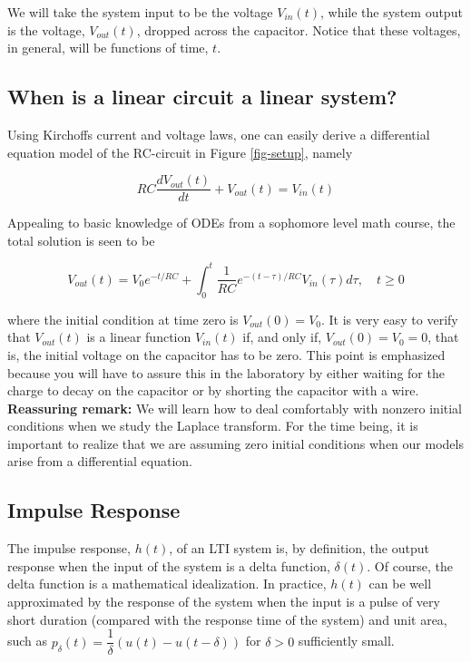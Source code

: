 \documentclass{article}
\begin{document}
We will take the system input to be the voltage $V_{in}(t)$, while the system output is the voltage, $V_{out}(t)$,
dropped across the capacitor. Notice that these voltages, in general, will be functions of time, $t$.

\subsection{When is a linear circuit a linear system?}

Using Kirchoffs current and voltage laws, one can easily derive a differential equation model of the RC-circuit
in Figure \ref{fig-setup}, namely

\begin{equation}
	RC\frac{dV_{out}(t)}{dt}+V_{out}(t)=V_{in}(t)
\end{equation}

Appealing to basic knowledge of ODEs from a sophomore level math course, the total solution is seen to be

\begin{equation}
	V_{out}(t)=V_0e^{-t/RC}+\int_0^t\frac{1}{RC}e^{-(t-\tau)/RC}V_{in}(\tau)d\tau,\quad t\geqslant0
\end{equation}

where the initial condition at time zero is $V_{out}(0)=V_0$. It is very easy to verify that $V_{out}(t)$ is a linear
function $V_{in}(t)$ if, and only if, $V_{out}(0)=V_0=0$, that is, the initial voltage on the capacitor has to be zero.
This point is emphasized because you will have to assure this in the laboratory by either waiting for the
charge to decay on the capacitor or by shorting the capacitor with a wire.\\

\textbf{Reassuring remark:} We will learn how to deal comfortably with nonzero initial conditions when we
study the Laplace transform. For the time being, it is important to realize that we are assuming zero initial
conditions when our models arise from a differential equation.

\subsection{Impulse Response}

The impulse response, $h(t)$, of an LTI system is, by definition, the output response when the input of the
system is a delta function, $\delta(t)$. Of course, the delta function is a mathematical idealization. In practice,
$h(t)$ can be well approximated by the response of the system when the input is a pulse of very short duration (compared with the response time of the system) and unit area, such as $p_\delta(t)=\dfrac{1}{\delta}(u(t)-u(t-\delta))$ for $\delta>0$ sufficiently small.
\end{document}
